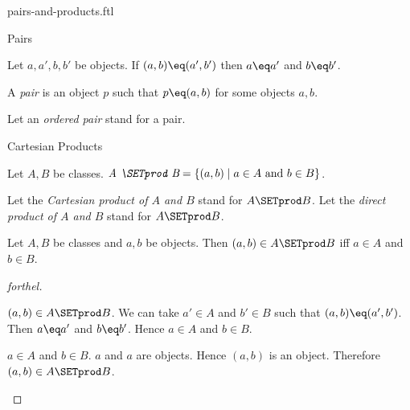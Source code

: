 \documentclass{naproche-library}
\begin{document}
\begin{smodule}[title=Ordered Pairs and Cartesian Products]{pairs-and-products.ftl}

\begin{sfragment}{Pairs}
  \begin{axiom}[forthel,id=FOUNDATIONS_04_8464577431863296]
    Let $a, a', b, b'$ be objects.
    If $(a, b) \eq (a', b')$ then $a \eq a'$ and $b \eq b'$.
  \end{axiom}

  \begin{definition}[forthel,id=FOUNDATIONS_04_4782386822774784]
    A \emph{pair} is an object $p$ such that $p \eq (a, b)$ for some objects $a, b$.

    Let an \emph{ordered pair} stand for a pair.
  \end{definition}
\end{sfragment}

\begin{sfragment}{Cartesian Products}
  \begin{definition}[forthel,id=FOUNDATIONS_04_2877806274936832]
    Let $A, B$ be classes.
    $\emph{A \SETprod B} = \{ (a, b) \mid a \in A\text{ and }b \in B \}$.

    Let the \emph{Cartesian product of $A$ and $B$} stand for $A \SETprod B$.
    Let the \emph{direct product of $A$ and $B$} stand for $A \SETprod B$.
  \end{definition}

  \begin{proposition}[forthel,id=FOUNDATIONS_04_1581118511906816]
    Let $A, B$ be classes and $a, b$ be objects.
    Then $(a, b) \in A \SETprod B$ iff $a \in A$ and $b \in B$.
  \end{proposition}
  \begin{proof}[forthel]
    \begin{case}{$(a, b) \in A \SETprod B$.}
      We can take $a' \in A$ and $b' \in B$ such that $(a, b) \eq (a', b')$.
      Then $a \eq a'$ and $b \eq b'$.
      Hence $a \in A$ and $b \in B$.
    \end{case}

    \begin{case}{$a \in A$ and $b \in B$.}
      $a$ and $a$ are objects.
      Hence $(a, b)$ is an object.
      Therefore $(a, b) \in A \SETprod B$.
    \end{case}
  \end{proof}


\end{sfragment}
\end{smodule}
\end{document}
